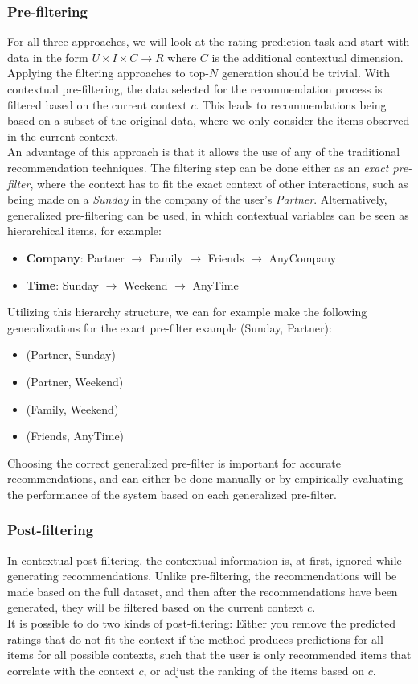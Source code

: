 \subsubsection*{Pre-filtering}
For all three approaches, we will look at the rating prediction task and start with data in the form $U \times I \times C \rightarrow R$ where $C$ is the additional contextual dimension.\\
Applying the filtering approaches to top-$N$ generation should be trivial.
With contextual pre-filtering, the data selected for the recommendation process is filtered based on the current context $c$.
This leads to recommendations being based on a subset of the original data, where we only consider the items observed in the current context.\\
An advantage of this approach is that it allows the use of any of the traditional recommendation techniques\cite{Adomavicius2011}.
The filtering step can be done either as an \textit{exact pre-filter}, where the context has to fit the exact context of other interactions, such as being made on a \textit{Sunday} in the company of the user's \textit{Partner}.
Alternatively, generalized pre-filtering can be used\cite{Adomavicius2011}, in which contextual variables can be seen as hierarchical items, for example:
\begin{itemize}
	\item \textbf{Company}: Partner $\rightarrow$ Family $\rightarrow$ Friends $\rightarrow$ AnyCompany
	\item \textbf{Time}: Sunday $\rightarrow$ Weekend $\rightarrow$ AnyTime
\end{itemize}
Utilizing this hierarchy structure, we can for example make the following generalizations for the exact pre-filter example (Sunday, Partner):
\begin{itemize}
	\item (Partner, Sunday)
	\item (Partner, Weekend)
	\item (Family, Weekend)
	\item (Friends, AnyTime)
\end{itemize}
Choosing the correct generalized pre-filter is important for accurate recommendations, and can either be done manually or by empirically evaluating the performance of the system based on each generalized pre-filter.

\subsubsection*{Post-filtering}
In contextual post-filtering, the contextual information is, at first, ignored while generating recommendations.
Unlike pre-filtering, the recommendations will be made based on the full dataset, and then after the recommendations have been generated, they will be filtered based on the current context $c$.\\
It is possible to do two kinds of post-filtering: Either you remove the predicted ratings that do not fit the context if the method produces predictions for all items for all possible contexts, such that the user is only recommended items that correlate with the context $c$, or adjust the ranking of the items based on $c$.

